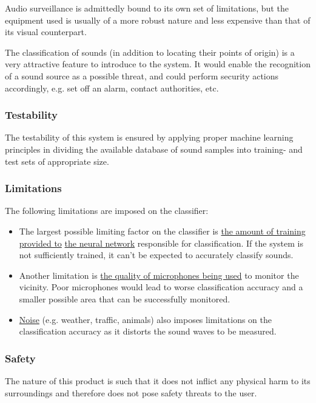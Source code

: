 \documentclass[a4paper,12pt]{article}
\numberwithin{equation}{section}
\numberwithin{figure}{section}
\numberwithin{table}{section}
\begin{document}
Audio surveillance is admittedly bound to its own set of limitations, but the equipment used is usually of a more robust nature and less expensive than that of its visual counterpart.

The classification of sounds (in addition to locating their points of origin) is a very attractive feature to introduce to the system. It would enable the recognition of a sound source as a possible threat, and could perform security actions accordingly, e.g. set off an alarm, contact authorities, etc.

\subsubsection{Testability}
The testability of this system is ensured by applying proper machine learning principles in dividing the available database of sound samples into training- and test sets of appropriate size.


\subsubsection{Limitations}
The following limitations are imposed on the classifier:
\begin{itemize}
    \item The largest possible limiting factor on the classifier is \underline{the amount of training provided to} \underline{the neural network} responsible for classification. If the system is not sufficiently trained, it can't be expected to accurately classify sounds.
    \item Another limitation is \underline{the quality of microphones being used} to monitor the vicinity. Poor microphones would lead to worse classification accuracy and a smaller possible area that can be successfully monitored.
    \item \underline{Noise} (e.g. weather, traffic, animals) also imposes limitations on the classification accuracy as it distorts the sound waves to be measured.
\end{itemize}



\subsubsection{Safety}
The nature of this product is such that it does not inflict any physical harm to its surroundings and therefore does not pose safety threats to the user.
\end{document}
